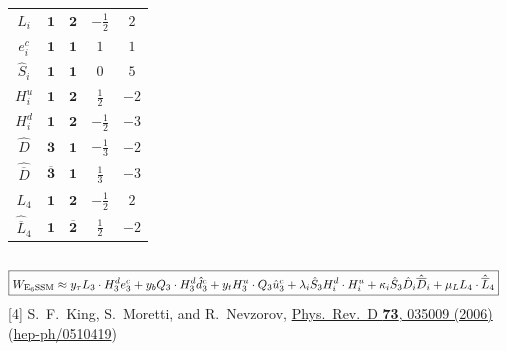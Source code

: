 \documentclass[10pt,aspectratio=169]{beamer}
\begin{document}
\begin{frame}
\begin{columns}[t]
\begin{column}{0.5\textwidth}
\begin{table}[h]
\begin{tabular}{ccccc}
            $L_i$ & $\mathbf{1}$ & $\mathbf{2}$ & $-\frac{1}{2}$ & $2$ \\
            $e_i^c$ & $\mathbf{1}$ & $\mathbf{1}$ & $1$ & $1$ \\
            $\hat{S}_i$ & $\mathbf{1}$ & $\mathbf{1}$ & $0$ & $5$ \\
            $H_i^u$ & $\mathbf{1}$ & $\mathbf{2}$ & $\frac{1}{2}$
            & $-2$ \\
            $H_i^d$ & $\mathbf{1}$ & $\mathbf{2}$ & $-\frac{1}{2}$
            & $-3$ \\
            $\hat{D}$ & $\mathbf{3}$ & $\mathbf{1}$ & $-\frac{1}{3}$ & $-2$ \\
            $\hat{\overline{D}}$ & $\mathbf{\overline{3}}$ &  $\mathbf{1}$
            & $\frac{1}{3}$ & $-3$ \\
            $L_4$ & $\mathbf{1}$ & $\mathbf{2}$ & $-\frac{1}{2}$ & $2$ \\
            $\hat{\overline{L}}_4$ & $\mathbf{1}$ & $\mathbf{\overline{2}}$
            & $\frac{1}{2}$ & $-2$ \\
            \bottomrule
          \end{tabular}
        \end{table}
      \end{column}
    \end{columns}
    \vspace{-4pt}
    \begin{align*}
      \Aboxed{W_{\text{E}_6\text{SSM}} \approx y_{\tau} L_3 \cdot
        H^d_3 e^c_3 + y_b Q_3 \cdot H^d_3 \hat{d}_3^c
        + y_t H^u_3 \cdot Q_3 \hat{u}_3^c + \lambda_i \hat{S}_3
        H_i^d \cdot H_i^u  + \kappa_i \hat{S}_3 \hat{D}_i
        \hat{\overline{D}}_i + \mu_L L_4 \cdot \hat{\overline{L}}_4}
    \end{align*}
        {\tiny [4] S.~F.~King, S.~Moretti, and R.~Nevzorov,
          \href{http://dx.doi.org/10.1103/PhysRevD.73.035009}{Phys.~Rev.~D
            \textbf{73}, 035009 (2006)}
          (\href{http://arxiv.org/abs/hep-ph/0510419}{hep-ph/0510419})}
\end{frame}
\end{document}
